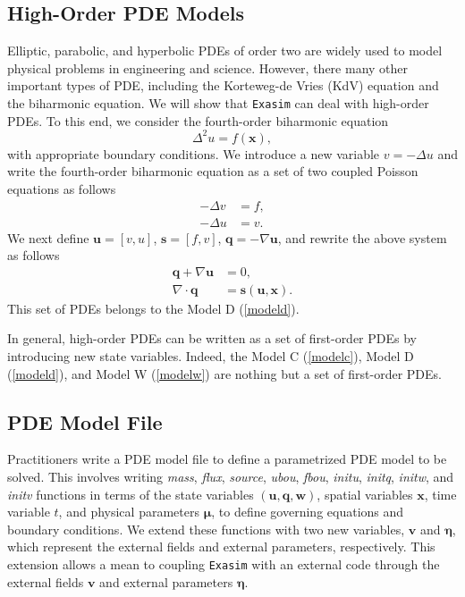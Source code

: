 \documentclass[11pt]{article}
\begin{document}
\subsection{High-Order PDE Models}

Elliptic, parabolic, and hyperbolic PDEs of order two are widely used to model physical problems in engineering and science. However, there many other important types of PDE, including the Korteweg-de Vries (KdV) equation and the biharmonic equation.  We will show that \texttt{Exasim} can deal with high-order PDEs. To this end, we consider the fourth-order biharmonic equation
\begin{equation}
\Delta^2 u = f(\bm x) ,
\end{equation}
with appropriate boundary conditions. We introduce a new variable $v = - \Delta u$ and write the fourth-order biharmonic equation as a set of two coupled Poisson equations as follows 
\begin{subequations}
\begin{alignat}{2}
-\Delta v & = f,\\
-\Delta u & = v .
\end{alignat}
\end{subequations}
We next define $\bm u = [v, u]$, $\bm s = [f, v]$, $\bm q = - \nabla \bm u$, and rewrite the above system as follows
\begin{subequations}
\begin{alignat}{2}
\bm q + \nabla \bm u & = 0,\\
\nabla \cdot \bm q & = \bm s(\bm u, \bm x) .
\end{alignat}
\end{subequations}
This set of PDEs belongs to the Model D (\ref{modeld}).

In general, high-order PDEs can be written as a set of first-order PDEs by introducing new state variables. Indeed, the Model C (\ref{modelc}), Model D (\ref{modeld}), and Model W (\ref{modelw}) are nothing but a set of first-order PDEs. 

\subsection{PDE Model File}

Practitioners write a PDE model file to define a parametrized PDE model to be solved.  This involves writing  {\em mass}, {\em flux},  {\em source}, {\em ubou},  {\em fbou},  {\em initu}, {\em initq}, {\em initw}, and {\em initv} functions in terms of the state variables $(\bm u, \bm q, \bm w)$, spatial variables $\bm x$, time variable $t$, and physical parameters $\bm \mu$, to define governing equations and boundary conditions. We extend these functions with two new variables, $\bm v$ and $\bm \eta$, which represent the external fields and external parameters, respectively. This extension allows a mean to coupling \texttt{Exasim} with an external code through the external fields $\bm v$ and external parameters $\bm \eta$. 
\end{document}
